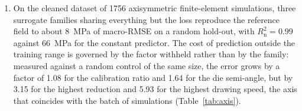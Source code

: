 \begin{enumerate}

\item On the cleaned dataset of 1756 axisymmetric finite-element simulations, three surrogate families sharing everything but the loss reproduce the reference field to about 8~MPa of macro-RMSE on a random hold-out, with $R^2_{\mathrm{n}} = 0.99$ against 66~MPa for the constant predictor. The cost of prediction outside the training range is governed by the factor withheld rather than by the family: measured against a random control of the same size, the error grows by a factor of 1.08 for the calibration ratio and 1.64 for the die semi-angle, but by 3.15 for the highest reduction and 5.93 for the highest drawing speed, the axis that coincides with the batch of simulations (Table~\ref{tab:axis}).


\end{enumerate}
